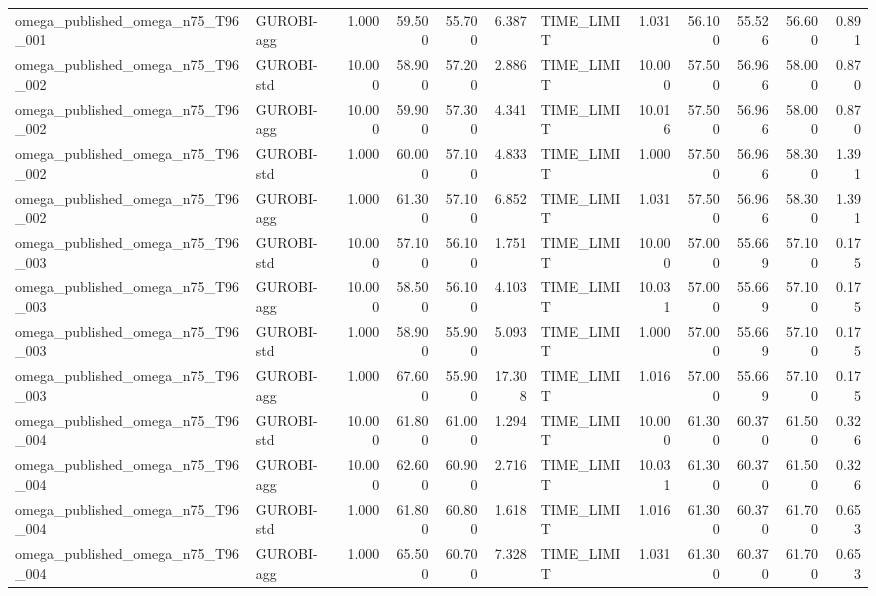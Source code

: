 \begin{table}[htbp]
\begin{tabular}{llrrrrlrrrrr}
omega\_published\_omega\_n75\_T96\_001 & GUROBI-agg & 1.000 & 59.500 & 55.700 & 6.387 & TIME\_LIMIT & 1.031 & 56.100 & 55.526 & 56.600 & 0.891 \\
omega\_published\_omega\_n75\_T96\_002 & GUROBI-std & 10.000 & 58.900 & 57.200 & 2.886 & TIME\_LIMIT & 10.000 & 57.500 & 56.966 & 58.000 & 0.870 \\
omega\_published\_omega\_n75\_T96\_002 & GUROBI-agg & 10.000 & 59.900 & 57.300 & 4.341 & TIME\_LIMIT & 10.016 & 57.500 & 56.966 & 58.000 & 0.870 \\
omega\_published\_omega\_n75\_T96\_002 & GUROBI-std & 1.000 & 60.000 & 57.100 & 4.833 & TIME\_LIMIT & 1.000 & 57.500 & 56.966 & 58.300 & 1.391 \\
omega\_published\_omega\_n75\_T96\_002 & GUROBI-agg & 1.000 & 61.300 & 57.100 & 6.852 & TIME\_LIMIT & 1.031 & 57.500 & 56.966 & 58.300 & 1.391 \\
omega\_published\_omega\_n75\_T96\_003 & GUROBI-std & 10.000 & 57.100 & 56.100 & 1.751 & TIME\_LIMIT & 10.000 & 57.000 & 55.669 & 57.100 & 0.175 \\
omega\_published\_omega\_n75\_T96\_003 & GUROBI-agg & 10.000 & 58.500 & 56.100 & 4.103 & TIME\_LIMIT & 10.031 & 57.000 & 55.669 & 57.100 & 0.175 \\
omega\_published\_omega\_n75\_T96\_003 & GUROBI-std & 1.000 & 58.900 & 55.900 & 5.093 & TIME\_LIMIT & 1.000 & 57.000 & 55.669 & 57.100 & 0.175 \\
omega\_published\_omega\_n75\_T96\_003 & GUROBI-agg & 1.000 & 67.600 & 55.900 & 17.308 & TIME\_LIMIT & 1.016 & 57.000 & 55.669 & 57.100 & 0.175 \\
omega\_published\_omega\_n75\_T96\_004 & GUROBI-std & 10.000 & 61.800 & 61.000 & 1.294 & TIME\_LIMIT & 10.000 & 61.300 & 60.370 & 61.500 & 0.326 \\
omega\_published\_omega\_n75\_T96\_004 & GUROBI-agg & 10.000 & 62.600 & 60.900 & 2.716 & TIME\_LIMIT & 10.031 & 61.300 & 60.370 & 61.500 & 0.326 \\
omega\_published\_omega\_n75\_T96\_004 & GUROBI-std & 1.000 & 61.800 & 60.800 & 1.618 & TIME\_LIMIT & 1.016 & 61.300 & 60.370 & 61.700 & 0.653 \\
omega\_published\_omega\_n75\_T96\_004 & GUROBI-agg & 1.000 & 65.500 & 60.700 & 7.328 & TIME\_LIMIT & 1.031 & 61.300 & 60.370 & 61.700 & 0.653 \\
\bottomrule
\end{tabular}
\end{table}
